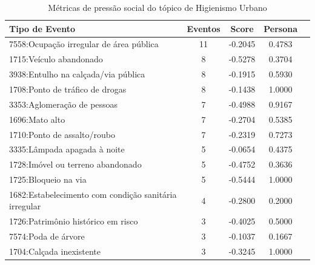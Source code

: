 \begin{table}[htbp]
	\centering
	\caption{Métricas de pressão social do tópico de Higienismo Urbano}
	\label{tab:eventos_populares_homeland}
	\begin{tabular}{|l|c|c|c|c|}
		\hline
		\textbf{Tipo de Evento}                               & \textbf{Eventos} & \textbf{Score} & \textbf{Persona} \\
		\hline
		7558:Ocupação irregular de área pública               & 11               & -0.2045        & 0.4783           \\
		\hline
		1715:Veículo abandonado                               & 8                & -0.5278        & 0.3704           \\
		\hline
		3938:Entulho na calçada/via pública                   & 8                & -0.1915        & 0.5930           \\
		\hline
		1708:Ponto de tráfico de drogas                       & 8                & -0.1438        & 1.0000           \\
		\hline
		3353:Aglomeração de pessoas                           & 7                & -0.4988        & 0.9167           \\
		\hline
		1696:Mato alto                                        & 7                & -0.2704        & 0.5385           \\
		\hline
		1710:Ponto de assalto/roubo                           & 7                & -0.2319        & 0.7273           \\
		\hline
		3335:Lâmpada apagada à noite                          & 5                & -0.0654        & 0.4375           \\
		\hline
		1728:Imóvel ou terreno abandonado                     & 5                & -0.4752        & 0.3636           \\
		\hline
		1725:Bloqueio na via                                  & 5                & -0.5444        & 1.0000           \\
		\hline
		1682:Estabelecimento com condição sanitária irregular & 4                & -0.2800        & 0.2000           \\
		\hline
		1726:Patrimônio histórico em risco                    & 3                & -0.4025        & 0.5000           \\
		\hline
		7574:Poda de árvore                                   & 3                & -0.1037        & 0.1667           \\
		\hline
		1704:Calçada inexistente                              & 3                & -0.3245        & 1.0000           \\

\end{tabular}
\end{table}
